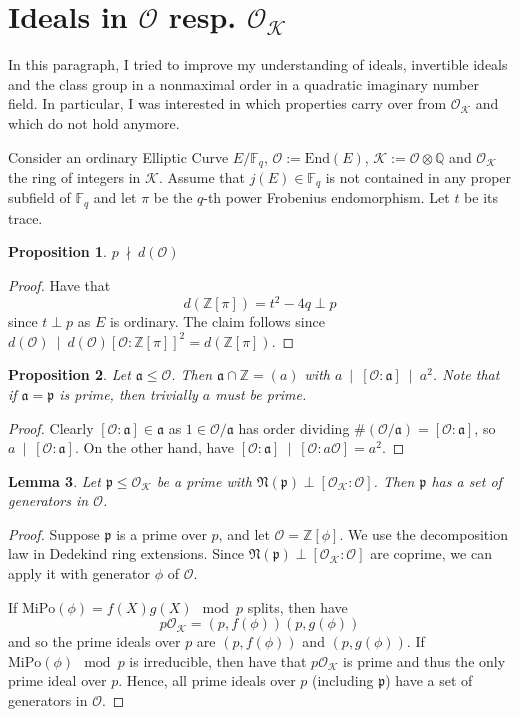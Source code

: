 \documentclass{scrartcl}
\newcommand{\N}{\mathbb{N}}
\newcommand{\Z}{\mathbb{Z}}
\newcommand{\F}{\mathbb{F}}
\newcommand{\End}{\mathrm{End}}
\newcommand{\divides}{\ \mid \ }
\newcommand{\notdivides}{\ \nmid \ }
\newcommand{\K}{\mathcal{K}}
\newcommand{\p}{\mathfrak{p}}
\renewcommand{\a}{\mathfrak{a}}
\renewcommand{\O}{\mathcal{O}}
\renewcommand{\N}{\mathfrak{N}}
\newtheorem{prop}{Proposition}[section]
\newtheorem{lemma}[prop]{Lemma}
\theoremstyle{definition}
\begin{document}
\section{Ideals in $\O$ resp. $\O_\K$}
In this paragraph, I tried to improve my understanding of ideals, invertible ideals and the class group in a nonmaximal order in a quadratic imaginary number field.
In particular, I was interested in which properties carry over from $\O_\K$ and which do not hold anymore.

Consider an ordinary Elliptic Curve $E/\F_q$, $\O := \End(E)$, $\K := \O \otimes \mathbb{Q}$ and $\O_\K$ the ring of integers in $\K$.
Assume that $j(E) \in \F_q$ is not contained in any proper subfield of $\F_q$ and let $\pi$ be the $q$-th power Frobenius endomorphism.
Let $t$ be its trace.
\begin{prop}
    $p \notdivides d(\O)$
\end{prop}
\begin{proof}
    Have that 
    \begin{equation*}
        d(\Z[\pi]) = t^2 - 4q \perp p
    \end{equation*}
    since $t \perp p$ as $E$ is ordinary.
    The claim follows since $d(\O) \divides d(\O) [\O : \Z[\pi]]^2 = d(\Z[\pi])$.
\end{proof}
\begin{prop}
    Let $\a \leq \O$. Then $\a \cap \Z = (a)$ with $a \divides [\O : \a] \divides a^2$.
    Note that if $\a = \p$ is prime, then trivially $a$ must be prime.
\end{prop}
\begin{proof}
    Clearly $[\O : \a] \in \a$ as $1 \in \O/\a$ has order dividing $\#(\O/\a) = [\O : \a]$, so $a \divides [\O : \a]$.
    On the other hand, have $[\O : \a] \divides [\O : a\O] = a^2$.
\end{proof}
\begin{lemma}
    Let $\p \leq \O_\K$ be a prime with $\N(\p) \perp [\O_\K : \O]$.
    Then $\p$ has a set of generators in $\O$.
\end{lemma}
\begin{proof}
    Suppose $\p$ is a prime over $p$, and let $\O = \Z[\phi]$.
    We use the decomposition law in Dedekind ring extensions.
    Since $\N(\p) \perp [\O_\K : \O]$ are coprime, we can apply it with generator $\phi$ of $\O$.

    If $\mathrm{MiPo}(\phi) = f(X)g(X) \mod p$ splits, then have
    \begin{equation*}
        p\O_\K = (p, f(\phi))(p, g(\phi))
    \end{equation*}
    and so the prime ideals over $p$ are $(p, f(\phi))$ and $(p, g(\phi))$.
    If $\mathrm{MiPo}(\phi) \mod p$ is irreducible, then have that $p\O_\K$ is prime and thus the only prime ideal over $p$.
    Hence, all prime ideals over $p$ (including $\p$) have a set of generators in $\O$.
\end{proof}
\end{document}
